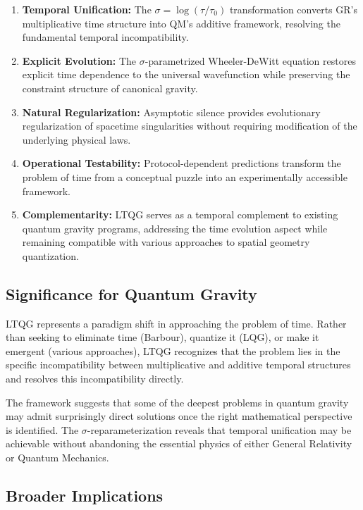 \documentclass[12pt,a4paper]{article}
\begin{document}
\begin{enumerate}
\item \textbf{Temporal Unification:} The $\sigma = \log(\tau/\tau_0)$ transformation converts GR's multiplicative time structure into QM's additive framework, resolving the fundamental temporal incompatibility.

\item \textbf{Explicit Evolution:} The $\sigma$-parametrized Wheeler-DeWitt equation restores explicit time dependence to the universal wavefunction while preserving the constraint structure of canonical gravity.

\item \textbf{Natural Regularization:} Asymptotic silence provides evolutionary regularization of spacetime singularities without requiring modification of the underlying physical laws.

\item \textbf{Operational Testability:} Protocol-dependent predictions transform the problem of time from a conceptual puzzle into an experimentally accessible framework.

\item \textbf{Complementarity:} LTQG serves as a temporal complement to existing quantum gravity programs, addressing the time evolution aspect while remaining compatible with various approaches to spatial geometry quantization.
\end{enumerate}

\subsection{Significance for Quantum Gravity}

LTQG represents a paradigm shift in approaching the problem of time. Rather than seeking to eliminate time (Barbour), quantize it (LQG), or make it emergent (various approaches), LTQG recognizes that the problem lies in the specific incompatibility between multiplicative and additive temporal structures and resolves this incompatibility directly.

The framework suggests that some of the deepest problems in quantum gravity may admit surprisingly direct solutions once the right mathematical perspective is identified. The $\sigma$-reparameterization reveals that temporal unification may be achievable without abandoning the essential physics of either General Relativity or Quantum Mechanics.

\subsection{Broader Implications}
\end{document}
